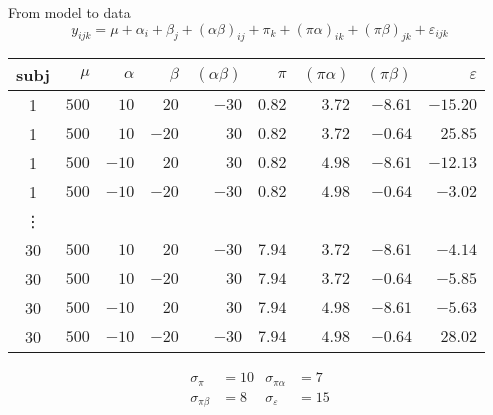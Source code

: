 \documentclass{beamer}
\begin{document}
\begin{frame}{From model to data}
 \[
   y_{ijk} = \mu + \alpha_i + \beta_j + (\alpha\beta)_{ij} + \pi_k +
   (\pi\alpha)_{ik} + (\pi\beta)_{jk} + \varepsilon_{ijk}
 \]

  \begin{tabular}{crrrrrrrr}
    \hline
    subj & $\mu$ & $\alpha$ & $\beta$ & $(\alpha\beta)$ & $\pi$ & $(\pi\alpha)$ &
    $(\pi\beta)$ & $\varepsilon$ \\
    \hline
    1 & $500$ & $ 10$ & $ 20$ & $-30$ & $0.82$ & $3.72$ & $-8.61$ & $-15.20$\\
    1 & $500$ & $ 10$ & $-20$ & $ 30$ & $0.82$ & $3.72$ & $-0.64$ & $ 25.85$\\
    1 & $500$ & $-10$ & $ 20$ & $ 30$ & $0.82$ & $4.98$ & $-8.61$ & $-12.13$\\
    1 & $500$ & $-10$ & $-20$ & $-30$ & $0.82$ & $4.98$ & $-0.64$ & $ -3.02$\\
    \vdots & & & & & & & & \\
    30 & $500$ & $ 10$ & $ 20$ & $-30$ & $7.94$ & $3.72$ & $-8.61$ & $-4.14$\\
    30 & $500$ & $ 10$ & $-20$ & $ 30$ & $7.94$ & $3.72$ & $-0.64$ & $-5.85$\\
    30 & $500$ & $-10$ & $ 20$ & $ 30$ & $7.94$ & $4.98$ & $-8.61$ & $-5.63$\\
    30 & $500$ & $-10$ & $-20$ & $-30$ & $7.94$ & $4.98$ & $-0.64$ & $28.02$\\
    \hline
  \end{tabular}

  \begin{align*}
    \sigma_{\pi}      & = 10 & \sigma_{\pi\alpha}   & =  7 \\
    \sigma_{\pi\beta} & =  8 & \sigma_{\varepsilon} & = 15
  \end{align*}
\end{frame}
\end{document}
